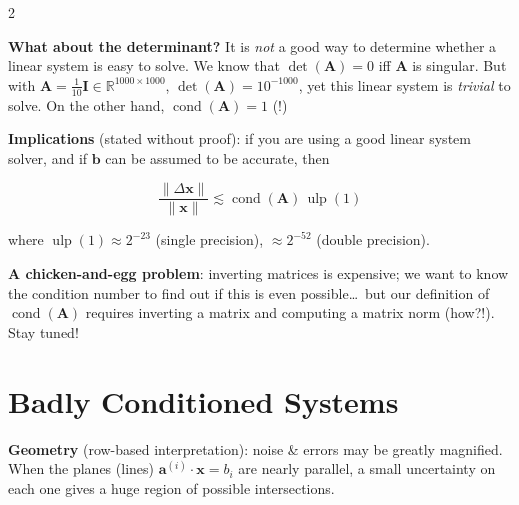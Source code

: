 \documentclass[a4paper,9pt]{extarticle}
\begin{document}
\begin{multicols}{2}
\begin{summary}
\end{summary}


\begin{warning}

\textbf{What about the determinant?} It is \emph{not} a good way to determine whether a linear
system is easy to solve. We know that $\det(\mathbf{A}) = 0$ iff $\mathbf{A}$ is singular. But
with $\mathbf{A} = \frac{1}{10}\mathbf{I} \in \mathbb{R}^{1000 \times 1000}$,
$\det(\mathbf{A}) = 10^{-1000}$, yet this linear system is \emph{trivial} to solve. On the other
hand, $\operatorname{cond}(\mathbf{A}) = 1$ (!)

\end{warning}


\begin{important}

\textbf{Implications} (stated without proof): if you are using a good linear system solver, and
if $\mathbf{b}$ can be assumed to be accurate, then

\[
\frac{\|\Delta\mathbf{x}\|}{\|\mathbf{x}\|} \lesssim \operatorname{cond}(\mathbf{A})\,
\operatorname{ulp}(1)
\]

where $\operatorname{ulp}(1) \approx 2^{-23}$ (single precision), $\approx 2^{-52}$ (double
precision).

\end{important}


\begin{warning}

\textbf{A chicken-and-egg problem}: inverting matrices is expensive; we want to know the
condition number to find out if this is even possible\dots\ but our definition of
$\operatorname{cond}(\mathbf{A})$ requires inverting a matrix and computing a matrix norm (how?!).
Stay tuned!

\end{warning}



\section{Badly Conditioned Systems}


\begin{important}

\textbf{Geometry} (row-based interpretation): noise \& errors may be greatly magnified. When the
planes (lines) $\mathbf{a}^{(i)} \cdot \mathbf{x} = b_i$ are nearly parallel, a small uncertainty
on each one gives a huge region of possible intersections.


\end{important}
\end{multicols}
\end{document}
